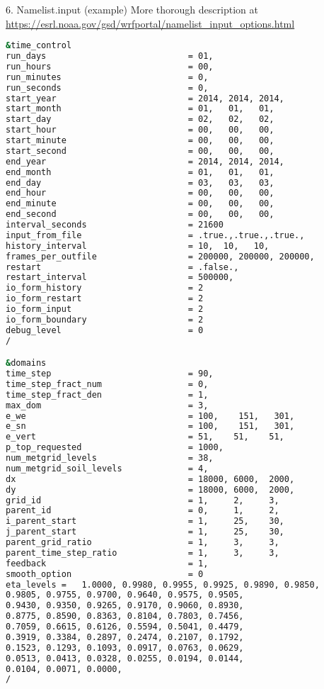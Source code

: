 \documentclass{beamer}
\begin{document}
\begin{frame}[fragile, allowframebreaks=.95, t]{6. Namelist.input (example)}
More thorough description at \url{https://esrl.noaa.gov/gsd/wrfportal/namelist_input_options.html}
\begin{lstlisting}[backgroundcolor = \color{light-gray}, language=bash]
&time_control
run_days                            = 01,
run_hours                           = 00,
run_minutes                         = 0,
run_seconds                         = 0,
start_year                          = 2014, 2014, 2014,
start_month                         = 01,   01,   01,
start_day                           = 02,   02,   02,
start_hour                          = 00,   00,   00,
start_minute                        = 00,   00,   00,
start_second                        = 00,   00,   00,
end_year                            = 2014, 2014, 2014,
end_month                           = 01,   01,   01,
end_day                             = 03,   03,   03,
end_hour                            = 00,   00,   00,
end_minute                          = 00,   00,   00,
end_second                          = 00,   00,   00,
interval_seconds                    = 21600
input_from_file                     = .true.,.true.,.true.,
history_interval                    = 10,  10,   10,
frames_per_outfile                  = 200000, 200000, 200000,
restart                             = .false.,
restart_interval                    = 500000,
io_form_history                     = 2
io_form_restart                     = 2
io_form_input                       = 2
io_form_boundary                    = 2
debug_level                         = 0
/

&domains
time_step                           = 90,
time_step_fract_num                 = 0,
time_step_fract_den                 = 1,
max_dom                             = 3,
e_we                                = 100,    151,   301,
e_sn                                = 100,    151,   301,
e_vert                              = 51,    51,    51,
p_top_requested                     = 1000,
num_metgrid_levels                  = 38,
num_metgrid_soil_levels             = 4,
dx                                  = 18000, 6000,  2000,
dy                                  = 18000, 6000,  2000,
grid_id                             = 1,     2,     3,
parent_id                           = 0,     1,     2,
i_parent_start                      = 1,     25,    30,
j_parent_start                      = 1,     25,    30,
parent_grid_ratio                   = 1,     3,     3,
parent_time_step_ratio              = 1,     3,     3,
feedback                            = 1,
smooth_option                       = 0
eta_levels =   1.0000, 0.9980, 0.9955, 0.9925, 0.9890, 0.9850,
0.9805, 0.9755, 0.9700, 0.9640, 0.9575, 0.9505,
0.9430, 0.9350, 0.9265, 0.9170, 0.9060, 0.8930,
0.8775, 0.8590, 0.8363, 0.8104, 0.7803, 0.7456,
0.7059, 0.6615, 0.6126, 0.5594, 0.5041, 0.4479,
0.3919, 0.3384, 0.2897, 0.2474, 0.2107, 0.1792,
0.1523, 0.1293, 0.1093, 0.0917, 0.0763, 0.0629,
0.0513, 0.0413, 0.0328, 0.0255, 0.0194, 0.0144,
0.0104, 0.0071, 0.0000,
/


\end{lstlisting}
\end{frame}
\end{document}
